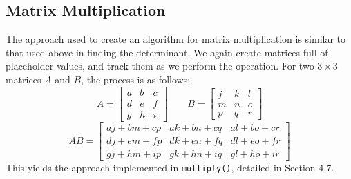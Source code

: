 \documentclass[12pt]{article}
\begin{document}
\subsection{Matrix Multiplication}
The approach used to create an algorithm for matrix multiplication is similar to that used above in finding the determinant. We again create matrices full of placeholder values, and track them as we perform the operation. For two $3\times3$ matrices $A$ and $B$, the process is as follows:
\[
A =
\begin{bmatrix}
    a & b & c \\
    d & e & f \\
    g & h & i
\end{bmatrix}
\qquad
B = 
\begin{bmatrix}
    j & k & l \\
    m & n & o \\
    p & q & r
\end{bmatrix}
\]
\begin{equation}
    AB = 
    \begin{bmatrix}
    a j + b m + c p & a k + b n + c q & a l + b o + c r \\
    d j + e m + f p & d k + e n + f q & d l + e o + f r \\
    g j + h m + i p & g k + h n + i q & g l + h o + i r
    \end{bmatrix}
\end{equation}
This yields the approach implemented in \texttt{multiply()}, detailed in Section 4.7.
\end{document}
